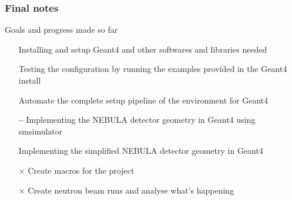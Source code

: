 \begin{frame}
\frametitle{Final notes}

\begin{block}{Goals and progress made so far}
	\begin{itemize}
		\item[{\color{PineGreen} \checkmark}] Installing and setup Geant4 and other softwares and libraries needed
		\item[{\color{PineGreen} \checkmark}] Testing the configuration by running the examples provided in the Geant4 install
		\item[{\color{PineGreen} \checkmark}] Automate the complete setup pipeline of the environment for Geant4
		\item[{\color{red} \textbf{--}}] Implementing the NEBULA detector geometry in Geant4 using smsimulator
		\item[{\color{PineGreen} \checkmark}] Implementing the simplified NEBULA detector geometry in Geant4
		\item[{\color{red} $\boldsymbol{\times}$}] Create macros for the project
		\item[{\color{red} $\boldsymbol{\times}$}] Create neutron beam runs and analyse what's happening
	\end{itemize}
\end{block}

\end{frame}